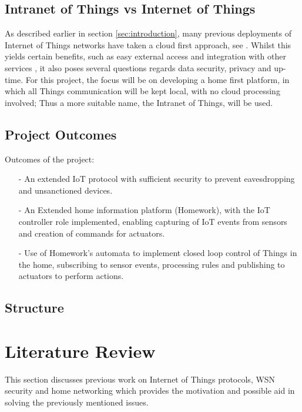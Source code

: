 \documentclass{mprop}
\begin{document}
\subsection{Intranet of Things vs Internet of Things} %
\label{sub:intranet_of_things}

As described earlier in section \ref{sec:introduction}, many previous deployments of Internet of Things networks have taken a cloud first approach, see \cite{SmartThings, Twine}. Whilst this yields certain benefits, such as easy external access and integration with other services \cite{IFTTT, Xively}, it also poses several questions regards data security, privacy and up-time. For this project, the focus will be on developing a home first platform, in which all Things communication will be kept local, with no cloud processing involved; Thus a more suitable name, the Intranet of Things, will be used. 


\subsection{Project Outcomes} %
\label{sub:project_outcomes}

Outcomes of the project:
\begin{itemize}
  \item[-] An extended IoT protocol with sufficient security to prevent eavesdropping and unsanctioned devices.
  \item[-] An Extended home information platform (Homework), with the IoT controller role implemented, enabling capturing of IoT events from sensors and creation of commands for actuators.
  \item[-] Use of Homework's automata to implement closed loop control of Things in the home, subscribing to sensor events, processing rules and publishing to actuators to perform actions.
\end{itemize}


\subsection{Structure} %
\label{sub:structure}

\section{Literature Review}
This section discusses previous work on Internet of Things protocols, WSN security and home networking which provides the motivation and possible aid in solving the previously mentioned issues.
\end{document}
